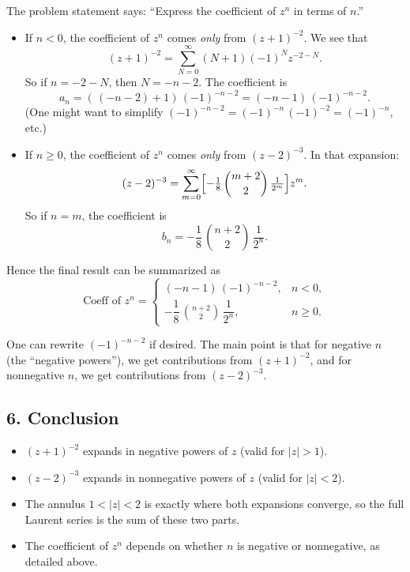 \documentclass[12pt]{article}
\theoremstyle{definition} %
\theoremstyle{plain} %
\begin{document}
The problem statement says: “Express the coefficient of \(z^n\) in terms of \(n\).”

\begin{itemize}
\item If \(n<0\), the coefficient of \(z^n\) comes \emph{only} from \((z+1)^{-2}\).  We see that
  \[
  (z+1)^{-2} = \sum_{N=0}^\infty (N+1)(-1)^N z^{-2-N}.
  \]
  So if \(n=-2-N\), then \(N=-n-2\).  The coefficient is
  \[
  a_n = (\,(-n-2)+1)\,(-1)^{-n-2}
       = (-n-1)\,(-1)^{-n-2}.
  \]
  (One might want to simplify $(-1)^{-n-2} = (-1)^{-n}\,(-1)^{-2}=(-1)^{-n}$, etc.)

\item If \(n\ge 0\), the coefficient of \(z^n\) comes \emph{only} from \((z-2)^{-3}\).  In that expansion:
  \[
  (z-2)^{-3} = \sum_{m=0}^\infty \Bigl[-\tfrac{1}{8}\,\binom{m+2}{2}\,\tfrac{1}{2^m}\Bigr] z^m.
  \]
  So if \(n=m\), the coefficient is
  \[
  b_n = -\frac{1}{8}\,\binom{n+2}{2}\,\frac{1}{2^n}.
  \]

\end{itemize}
Hence the final result can be summarized as
\[
\text{Coeff of }z^n
=\begin{cases}
(-n-1)\,(-1)^{-n-2}, & n<0,\\[6pt]
-\dfrac{1}{8}\,\binom{n+2}{2}\,\dfrac{1}{2^n}, & n\ge 0.
\end{cases}
\]

One can rewrite $(-1)^{-n-2}$ if desired.  The main point is that for negative $n$ (the “negative powers”), we get contributions from $(z+1)^{-2}$, and for nonnegative $n$, we get contributions from $(z-2)^{-3}$.

\bigskip

\subsection*{6. Conclusion}

\begin{itemize}
\item \(\displaystyle (z+1)^{-2}\) expands in negative powers of \(z\) (valid for \(|z|>1\)).
\item \(\displaystyle (z-2)^{-3}\) expands in nonnegative powers of \(z\) (valid for \(|z|<2\)).
\item The annulus \(1<|z|<2\) is exactly where both expansions converge, so the full Laurent series is the sum of these two parts.
\item The coefficient of \(z^n\) depends on whether \(n\) is negative or nonnegative, as detailed above.
\end{itemize}
\end{document}
